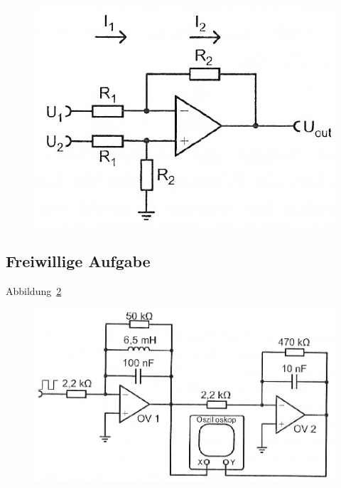 \begin{figure}[htbp]
	\centering
	\includegraphics[width=.6\linewidth]{Anleitung/5_6-7.png}
	\caption{%
		\cite[Abbildung~5/6.7]{physik313-Anleitung}
	}
	\label{fig:5_6-7}
\end{figure}

\FloatBarrier
\subsection{Freiwillige Aufgabe}

Abbildung~\ref{fig:5-2}

\begin{figure}[htbp]
	\centering
	\includegraphics[width=.6\linewidth]{Anleitung/5-2.png}
	\caption{%
		\cite[Abbildung~5.2]{physik313-Anleitung}
	}
	\label{fig:5-2}
\end{figure}


\FloatBarrier
\IfFileExists{\bibliographyfile}{
	
}{}



